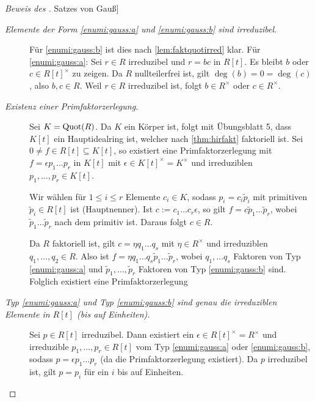 \documentclass[12pt,a4paper]{scrartcl}
\begin{document}
\newcommand{\hyperhyper}[2]{\hyperref[#1]{#2}}
\begin{proof}[Beweis des \hyperhyper{thm:gauss}{Satzes von Gauß}] %
	\leavevmode
	\begin{description}
		\item[\emph{Elemente der Form \ref{enumi:gauss:a} und \ref{enumi:gauss:b} sind irreduzibel.}] Für \ref{enumi:gauss:b} ist dies nach \cref{lem:faktquotirred} klar. Für \ref{enumi:gauss:a}: Sei $r\in R$ irreduzibel und $r = bc$ in $R[t]$. Es bleibt $b$ oder $c\in R[t]^{\times}$ zu zeigen. Da $R$ nullteilerfrei ist, gilt $\deg (b) = 0  =\deg (c)$, also $b,c\in R$. Weil $r\in R$ irreduzibel ist, folgt $b\in R^{\times}$ oder $c\in R^{\times}$.
		
		\item[\emph{Existenz einer Primfaktorzerlegung.}] Sei $K = \operatorname{Quot}(R)$. Da $K$ ein Körper ist, folgt mit Übungsblatt 5, dass $K[t]$ ein Hauptidealring ist, welcher nach \cref{thm:hirfakt} faktoriell ist. Sei $0\neq f\in R[t]\subseteq K[t]$, so existiert eine Primfaktorzerlegung mit $f = \epsilon p_1\dots p_r$ in $K[t]$ mit $\epsilon\in K[t]^{\times} = K^{\times}$ und irreduziblen $p_1,\dots,p_r\in K[t]$.
		
		Wir wählen für $1\leq i\leq r$ Elemente $c_i\in K$, sodass $p_i = c_i\tilde p_i$ mit primitiven $\tilde p_i\in R[t]$ ist (\glqq Hauptnenner\grqq). Ist $c := c_1\dots c_r\epsilon$, so gilt $f = c\tilde p_1\dots \tilde p_r$, wobei $\tilde p_1\dots\tilde p_r$ nach dem  primitiv ist. Daraus folgt $c\in R$.
		
		Da $R$ faktoriell ist, gilt $c = \eta q_1\dots q_s$ mit $\eta\in R^{\times}$ und irreduziblen $q_1,\dots,q_2\in R$. Also ist $f = \eta q_1\dots q_s\tilde p_1\dots \tilde p_r$, wobei $q_1,\dots q_s$ Faktoren von Typ \ref{enumi:gauss:a} und $\tilde p_1,\dots, \tilde p_r$ Faktoren von Typ \ref{enumi:gauss:b} sind. Folglich existiert eine Primfaktorzerlegung
		
		\item[\emph{Typ \ref{enumi:gauss:a} und Typ \ref{enumi:gauss:b} sind genau die irreduziblen Elemente in $R[t]$ (bis auf Einheiten).}] Sei $p\in R[t]$ irreduzibel. Dann existiert ein $\epsilon \in R[t]^{\times} = R^{\times}$ und irreduzible $p_1,\dots,p_r\in R[t]$ vom Typ \ref{enumi:gauss:a} oder \ref{enumi:gauss:b}, sodass $p = \epsilon p_1\dots p_r$ (da die Primfaktorzerlegung existiert). Da $p$ irreduzibel ist, gilt $p = p_i$ für ein $i$ bis auf Einheiten.
		

\end{description}
\end{proof}
\end{document}
